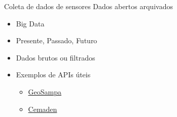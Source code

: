 \documentclass[t]{beamer}
\begin{document}
\begin{frame}{Coleta de dados de sensores}
	Dados abertos arquivados
	\begin{itemize}
		\item Big Data
		\item Presente, Passado, Futuro
		\item Dados brutos ou filtrados
		\item Exemplos de APIs úteis
		\begin{itemize}
			\item \href{http://geosampa.prefeitura.sp.gov.br/}{GeoSampa}
			\item \href{http://www.cemaden.gov.br/categoria/riscos-geo-hidrologicos/}{Cemaden}
		\end{itemize}
	\end{itemize}
\end{frame}

\frame{\titlepage}
\end{document}
